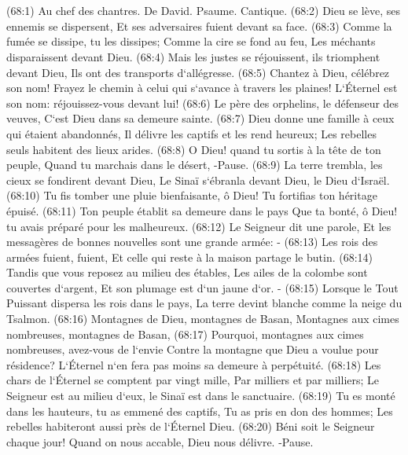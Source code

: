 \chapter{}

\verse (68:1) Au chef des chantres. De David. Psaume. Cantique. (68:2) Dieu se lève, ses ennemis se dispersent, Et ses adversaires fuient devant sa face. 
\verse (68:3) Comme la fumée se dissipe, tu les dissipes; Comme la cire se fond au feu, Les méchants disparaissent devant Dieu. 
\verse (68:4) Mais les justes se réjouissent, ils triomphent devant Dieu, Ils ont des transports d`allégresse. 
\verse (68:5) Chantez à Dieu, célébrez son nom! Frayez le chemin à celui qui s`avance à travers les plaines! L`Éternel est son nom: réjouissez-vous devant lui! 
\verse (68:6) Le père des orphelins, le défenseur des veuves, C`est Dieu dans sa demeure sainte. 
\verse (68:7) Dieu donne une famille à ceux qui étaient abandonnés, Il délivre les captifs et les rend heureux; Les rebelles seuls habitent des lieux arides. 
\verse (68:8) O Dieu! quand tu sortis à la tête de ton peuple, Quand tu marchais dans le désert, -Pause. 
\verse (68:9) La terre trembla, les cieux se fondirent devant Dieu, Le Sinaï s`ébranla devant Dieu, le Dieu d`Israël. 
\verse (68:10) Tu fis tomber une pluie bienfaisante, ô Dieu! Tu fortifias ton héritage épuisé. 
\verse (68:11) Ton peuple établit sa demeure dans le pays Que ta bonté, ô Dieu! tu avais préparé pour les malheureux. 
\verse (68:12) Le Seigneur dit une parole, Et les messagères de bonnes nouvelles sont une grande armée: - 
\verse (68:13) Les rois des armées fuient, fuient, Et celle qui reste à la maison partage le butin. 
\verse (68:14) Tandis que vous reposez au milieu des étables, Les ailes de la colombe sont couvertes d`argent, Et son plumage est d`un jaune d`or. - 
\verse (68:15) Lorsque le Tout Puissant dispersa les rois dans le pays, La terre devint blanche comme la neige du Tsalmon. 
\verse (68:16) Montagnes de Dieu, montagnes de Basan, Montagnes aux cimes nombreuses, montagnes de Basan, 
\verse (68:17) Pourquoi, montagnes aux cimes nombreuses, avez-vous de l`envie Contre la montagne que Dieu a voulue pour résidence? L`Éternel n`en fera pas moins sa demeure à perpétuité. 
\verse (68:18) Les chars de l`Éternel se comptent par vingt mille, Par milliers et par milliers; Le Seigneur est au milieu d`eux, le Sinaï est dans le sanctuaire. 
\verse (68:19) Tu es monté dans les hauteurs, tu as emmené des captifs, Tu as pris en don des hommes; Les rebelles habiteront aussi près de l`Éternel Dieu. 
\verse (68:20) Béni soit le Seigneur chaque jour! Quand on nous accable, Dieu nous délivre. -Pause. 
